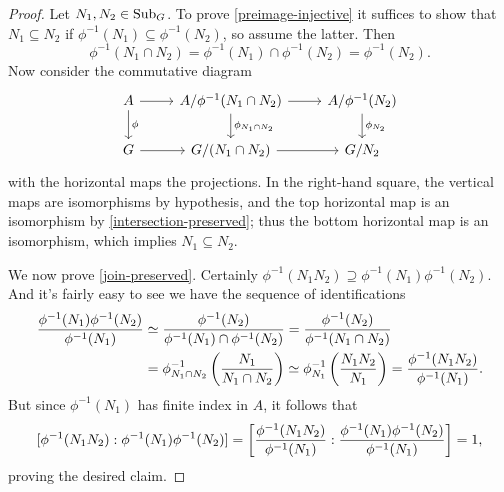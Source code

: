 \begin{proof}
  Let $N_1,N_2 \in \operatorname{Sub}_G$. To prove \eqref{preimage-injective} it
  suffices to show that $N_1 \subseteq N_2$ if
  $\phi^{-1}(N_1) \subseteq \phi^{-1}(N_2)$, so assume the
  latter. Then
  \begin{equation}
    \label{intersection-preserved}
    \phi^{-1}(N_1 \cap N_2) = \phi^{-1}(N_1) \cap \phi^{-1}(N_2) =
    \phi^{-1}(N_2).
  \end{equation}
  Now consider the commutative diagram
  \[
  \begin{tikzcd}
    A \ar[d, "\phi"] \ar[r] &
    A/\phi^{-1}(N_1 \cap N_2) \ar[d, "\phi_{N_1 \cap N_2}"] \ar[r] &
    A/\phi^{-1}(N_2) \ar[d, "\phi_{N_2}"] \\
    G \ar[r] & G/(N_1 \cap N_2) \ar[r] & G/N_2
  \end{tikzcd}
  \]
  with the horizontal maps the projections. In the right-hand square,
  the vertical maps are isomorphisms by hypothesis, and the top
  horizontal map is an isomorphism by \eqref{intersection-preserved};
  thus the bottom horizontal map is an isomorphism, which implies
  $N_1 \subseteq N_2$.

  We now prove \eqref{join-preserved}. Certainly
  $\phi^{-1}(N_1N_2) \supseteq \phi^{-1}(N_1)\phi^{-1}(N_2)$. And it's
  fairly easy to see we have the sequence of identifications
  \begin{align*}
    \frac{\phi^{-1}(N_1)\phi^{-1}(N_2)}{\phi^{-1}(N_1)}
    & \simeq \frac{\phi^{-1}(N_2)}{\phi^{-1}(N_1) \cap \phi^{-1}(N_2)}
      = \frac{\phi^{-1}(N_2)}{\phi^{-1}(N_1 \cap N_2)} \\
    & = \phi_{N_1 \cap N_2}^{-1}\left( \frac{N_1}{N_1 \cap N_2} \right)
      \simeq \phi_{N_1}^{-1}\left( \frac{N_1N_2}{N_1} \right)
      = \frac{\phi^{-1}(N_1N_2)}{\phi^{-1}(N_1)}.
  \end{align*}
  But since $\phi^{-1}(N_1)$ has finite index in $A$, it follows
  that
  \[
  [\phi^{-1}(N_1N_2) : \phi^{-1}(N_1)\phi^{-1}(N_2)] = \left[
  \frac{\phi^{-1}(N_1N_2)}{\phi^{-1}(N_1)} :
  \frac{\phi^{-1}(N_1)\phi^{-1}(N_2)}{\phi^{-1}(N_1)} \right] = 1,
  \]
  proving the desired claim.
\end{proof}


